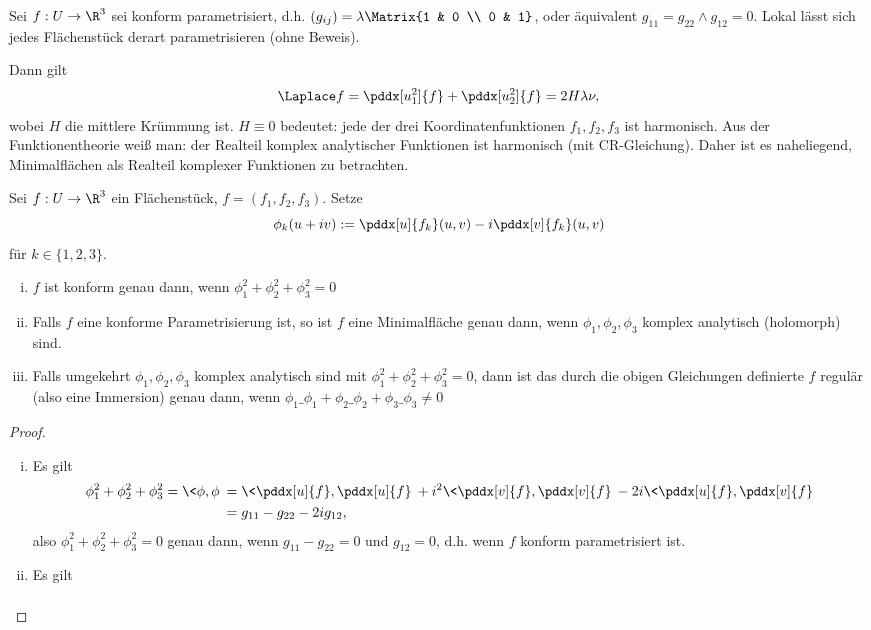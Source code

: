 
Sei $f: U \to \R^3$ sei konform parametrisiert, d.h. $(g_{ij}) = \lambda \Matrix{1 & 0 \\ 0 & 1}$, oder äquivalent $g_{11} = g_{22} \land g_{12} = 0$.
Lokal lässt sich jedes Flächenstück derart parametrisieren (ohne Beweis).

Dann gilt
\[
	\Laplace f = \pddx[u_1^2]{f} + \pddx[u_2^2]{f} = 2 H \lambda \nu,
\]
wobei $H$ die mittlere Krümmung ist.
$H \equiv 0$ bedeutet: jede der drei Koordinatenfunktionen $f_1, f_2, f_3$ ist harmonisch.
Aus der Funktionentheorie weiß man:
der Realteil komplex analytischer Funktionen ist harmonisch (mit CR-Gleichung).
Daher ist es naheliegend, Minimalflächen als Realteil komplexer Funktionen zu betrachten.

\begin{st}
	Sei $f: U \to \R^3$ ein Flächenstück, $f = (f_1, f_2, f_3)$.
	Setze
	\[
		\phi_k(u + iv) := \pddx[u]{f_k}(u,v) - i \pddx[v]{f_k}(u,v)
	\]
	für $k \in \{1, 2, 3\}$.
	\begin{enumerate}[(i)]
		\item
			$f$ ist konform genau dann, wenn $\phi_1^2 + \phi_2^2 + \phi_3^2 = 0$
		\item
			Falls $f$ eine konforme Parametrisierung ist, so ist $f$ eine Minimalfläche genau dann, wenn $\phi_1, \phi_2, \phi_3$ komplex analytisch (holomorph) sind.
		\item
			Falls umgekehrt $\phi_1, \phi_2, \phi_3$ komplex analytisch sind mit $\phi_1^2 + \phi_2^2 + \phi_3^2 = 0$, dann ist das durch die obigen Gleichungen definierte $f$ regulär (also eine Immersion) genau dann, wenn $\phi_1\_\phi_1 + \phi_2\_\phi_2 + \phi_3\_\phi_3 \neq 0$
	\end{enumerate}
	\begin{proof}
		\begin{enumerate}[(i)]
			\item
				Es gilt
				\begin{align*}
					\phi_1^2 + \phi_2^2 + \phi_3^2
					= \< \phi, \phi \>
					&= \< \pddx[u]{f}, \pddx[u]{f} \> + i^2 \<\pddx[v]{f}, \pddx[v]{f}\> - 2i \< \pddx[u]{f}, \pddx[v]{f} \> \\
					&= g_{11} - g_{22} - 2i g_{12},
				\end{align*}
				also $\phi_1^2 + \phi_2^2 + \phi_3^2 = 0$ genau dann, wenn $g_{11} - g_{22} = 0$ und $g_{12} = 0$, d.h. wenn $f$ konform parametrisiert ist.
			\item
				Es gilt
				\begin{align*}

\end{align*}
\end{enumerate}
\end{proof}
\end{st}
